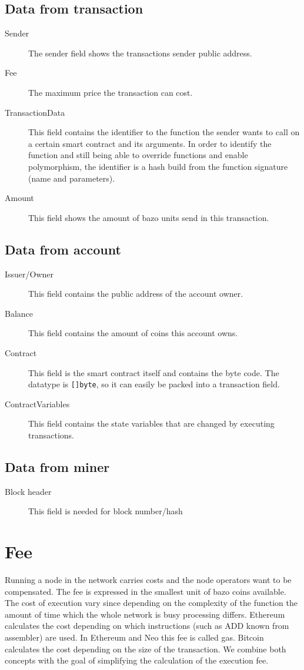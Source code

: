 \subsection{Data from transaction}
\begin{description}
  \item[Sender] The sender field shows the transactions sender public address.
  \item[Fee] The maximum price the transaction can cost.
  \item[TransactionData] This field contains the identifier to the function the sender wants to call on a certain smart contract and its arguments. In order to identify the function and still being able to override functions and enable polymorphism, the identifier is a hash build from the function signature (name and parameters).
  \item[Amount] This field shows the amount of bazo units send in this transaction.
\end{description}

\subsection{Data from account}
\begin{description}
  \item[Issuer/Owner] This field contains the public address of the account owner.
  \item[Balance] This field contains the amount of coins this account owns.
  \item[Contract] This field is the smart contract itself and contains the byte code. The datatype is \texttt{[]byte}, so it can easily be packed into a transaction field.
  \item[ContractVariables] This field contains the state variables that are changed by executing transactions.
\end{description}

\subsection{Data from miner}
\begin{description}
  \item[Block header] This field is needed for block number/hash
\end{description}

\section{Fee}
Running a node in the network carries costs and the node operators want to be compensated. The fee is expressed in the smallest unit of bazo coins available. The cost of execution vary since depending on the complexity of the function the amount of time which the whole network is busy processing differs. Ethereum calculates the cost depending on which instructions (such as ADD known from assembler) are used. In Ethereum and Neo this fee is called gas. Bitcoin calculates the cost depending on the size of the transaction. We combine both concepts with the goal of simplifying the calculation of the execution fee.

